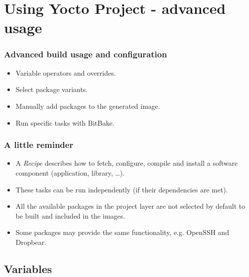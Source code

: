 \section{Using Yocto Project - advanced usage}

\begin{frame}
  \frametitle{Advanced build usage and configuration}
  \begin{itemize}
    \item Variable operators and overrides.
    \item Select package variants.
    \item Manually add packages to the generated image.
    \item Run specific tasks with BitBake.
  \end{itemize}
\end{frame}

\begin{frame}
  \frametitle{A little reminder}
  \begin{itemize}
    \item A {\em Recipe} describes how to fetch, configure, compile and
      install a software component (application, library, \dots).
    \item These tasks can be run independently (if their dependencies
      are met).
    \item All the available packages in the project layer are not
      selected by default to be built and included in the images.
    \item Some packages may provide the same functionality, e.g.
      OpenSSH and Dropbear.
  \end{itemize}
\end{frame}

\subsection{Variables}


